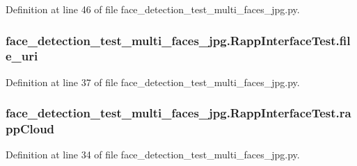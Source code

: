 Definition at line 46 of file face\-\_\-detection\-\_\-test\-\_\-multi\-\_\-faces\-\_\-jpg.\-py.

\hypertarget{classface__detection__test__multi__faces__jpg_1_1RappInterfaceTest_a8061b8d77167a61713c2d12b189f44a8}{
\subsubsection[{file\-\_\-uri}]{\setlength{\rightskip}{0pt plus 5cm}face\-\_\-detection\-\_\-test\-\_\-multi\-\_\-faces\-\_\-jpg.\-Rapp\-Interface\-Test.\-file\-\_\-uri}}\label{classface__detection__test__multi__faces__jpg_1_1RappInterfaceTest_a8061b8d77167a61713c2d12b189f44a8}


Definition at line 37 of file face\-\_\-detection\-\_\-test\-\_\-multi\-\_\-faces\-\_\-jpg.\-py.

\hypertarget{classface__detection__test__multi__faces__jpg_1_1RappInterfaceTest_a106c9ae6e2182f7409d1d8304b626fca}{
\subsubsection[{rapp\-Cloud}]{\setlength{\rightskip}{0pt plus 5cm}face\-\_\-detection\-\_\-test\-\_\-multi\-\_\-faces\-\_\-jpg.\-Rapp\-Interface\-Test.\-rapp\-Cloud}}\label{classface__detection__test__multi__faces__jpg_1_1RappInterfaceTest_a106c9ae6e2182f7409d1d8304b626fca}


Definition at line 34 of file face\-\_\-detection\-\_\-test\-\_\-multi\-\_\-faces\-\_\-jpg.\-py.

